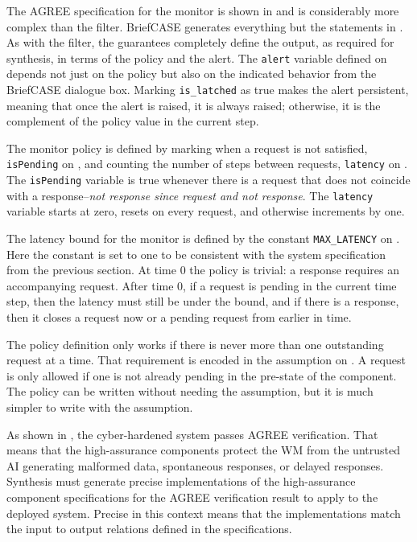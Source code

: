 The AGREE specification for the monitor is shown in  and is considerably more complex than the filter.
BriefCASE generates everything but the statements in .
As with the filter, the guarantees completely define the output, as required for synthesis, in terms of the policy and the alert.
The \texttt{alert} variable defined on  depends not just on the policy but also on the indicated behavior from the BriefCASE dialogue box. 
Marking \texttt{is\_latched} as true makes the alert persistent, meaning that once the alert is raised, it is always raised; otherwise, it is the complement of the policy value in the current step.

The monitor policy is defined by marking when a request is not satisfied, \texttt{isPending} on , and counting the number of steps between requests, \texttt{latency} on .
The \texttt{isPending} variable is true whenever there is a request that does not coincide with a response--\emph{not response since request and not response}.
The \texttt{latency} variable starts at zero, resets on every request, and otherwise increments by one.

The latency bound for the monitor is defined by the constant \texttt{MAX\_LATENCY} on .
Here the constant is set to one to be consistent with the system specification from the previous section.
At time 0 the policy is trivial: a response requires an accompanying request.
After time 0, if a request is pending in the current time step, then the latency must still be under the bound, and if there is a response, then it closes a request now or a pending request from earlier in time.

The policy definition only works if there is never more than one outstanding request at a time.
That requirement is encoded in the assumption on .
A request is only allowed if one is not already pending in the pre-state of the component.
The policy can be written without needing the assumption, but it is much simpler to write with the assumption.

As shown in , the cyber-hardened system passes AGREE verification.
That means that the high-assurance components protect the WM from the untrusted AI generating malformed data, spontaneous responses, or delayed responses.
Synthesis must generate precise implementations of the high-assurance component specifications for the AGREE verification result to apply to the deployed system.
Precise in this context means that the implementations match the input to output relations defined in the specifications.